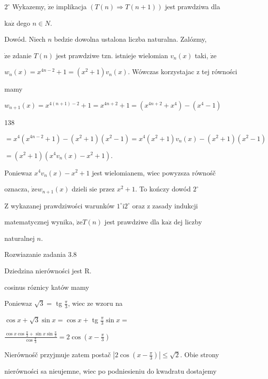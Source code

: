\documentclass[a4paper,12pt]{article}
\begin{document}
$2^{\circ}$ Wykazemy, $\dot{\mathrm{z}}\mathrm{e}$ implikacja $(T(n)\Rightarrow T(n+1))$ jest prawdziwa dla

$\mathrm{k}\mathrm{a}\dot{\mathrm{z}}$ dego $n\in N.$

Dowód. Niech $n$ bedzie dowolna ustalona liczba naturalna. Zalózmy,

$\dot{\mathrm{z}}\mathrm{e}$ zdanie $T(n)$ jest prawdziwe $\mathrm{t}\mathrm{z}\mathrm{n}$. istnieje wielomian $v_{n}(x)$ taki, $\dot{\mathrm{z}}\mathrm{e}$

$w_{n}(x) =x^{4n-2}+1 = (x^{2}+1)v_{n}(x)$. Wówczas korzystajac $\mathrm{z}$ tej równości

mamy

$w_{n+1}(x)=x^{4(n+1)-2}+1=x^{4n+2}+1=(x^{4n+2}+x^{4})-(x^{4}-1)$





138

$=x^{4}(x^{4n-2}+1)-(x^{2}+1)(x^{2}-1)=x^{4}(x^{2}+1)v_{n}(x)-(x^{2}+1)(x^{2}-1)$

$=(x^{2}+1)(x^{4}v_{n}(x)-x^{2}+1).$

Poniewaz $x^{4}v_{n}(x)-x^{2}+1$ jest wielomianem, wiec powyzsza równośč

oznacza, $\dot{\mathrm{z}}\mathrm{e}w_{n+1}(x)$ dzieli $\mathrm{s}\mathrm{i}\mathrm{e}$ przez $x^{2}+1$. To kończy dowód $2^{\circ}$

$\mathrm{Z}$ wykazanej prawdziwości warunków $1^{\circ} \mathrm{i} 2^{\circ}$ oraz $\mathrm{z}$ zasady indukcji

matematycznej wynika, $\dot{\mathrm{z}}\mathrm{e} T(n)$ jest prawdziwe dla $\mathrm{k}\mathrm{a}\dot{\mathrm{z}}$ dej liczby

naturalnej $n.$

Rozwiazanie zadania 3.8

Dziedzina nierówności jest R.

cosinus róznicy katów mamy

Poniewaz $\sqrt{3}=$ tg $\displaystyle \frac{\pi}{3}$, wiec ze wzoru na

$\cos x+\sqrt{3}\sin x=\cos x +$ tg $\displaystyle \frac{\pi}{3}\sin x=$

$\displaystyle \frac{\cos x\cos\frac{\pi}{3}+\sin x\sin\frac{\pi}{3}}{\cos\frac{\pi}{3}}=2\cos(x-\frac{\pi}{3})$

Nierównośč przyjmuje zatem postač $|2\displaystyle \cos(x-\frac{\pi}{3})| \leq \sqrt{2}$. Obie strony

nierówności sa nieujemne, wiec po podniesieniu do kwadratu dostajemy
\end{document}
